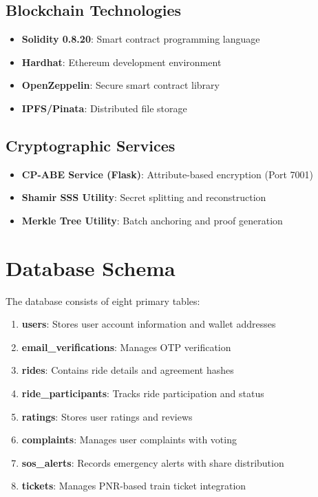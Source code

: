 \documentclass[12pt]{report}
\theoremstyle{plain}
\theoremstyle{definition}
\theoremstyle{remark}
\begin{document}
\subsection{Blockchain Technologies}

\begin{itemize}
    \item \textbf{Solidity 0.8.20}: Smart contract programming language
    \item \textbf{Hardhat}: Ethereum development environment
    \item \textbf{OpenZeppelin}: Secure smart contract library
    \item \textbf{IPFS/Pinata}: Distributed file storage
\end{itemize}

\subsection{Cryptographic Services}

\begin{itemize}
    \item \textbf{CP-ABE Service (Flask)}: Attribute-based encryption (Port 7001)
    \item \textbf{Shamir SSS Utility}: Secret splitting and reconstruction
    \item \textbf{Merkle Tree Utility}: Batch anchoring and proof generation
\end{itemize}

\section{Database Schema}

The database consists of eight primary tables:

\begin{enumerate}
    \item \textbf{users}: Stores user account information and wallet addresses
    \item \textbf{email\_verifications}: Manages OTP verification
    \item \textbf{rides}: Contains ride details and agreement hashes
    \item \textbf{ride\_participants}: Tracks ride participation and status
    \item \textbf{ratings}: Stores user ratings and reviews
    \item \textbf{complaints}: Manages user complaints with voting
    \item \textbf{sos\_alerts}: Records emergency alerts with share distribution
    \item \textbf{tickets}: Manages PNR-based train ticket integration
\end{enumerate}
\end{document}
